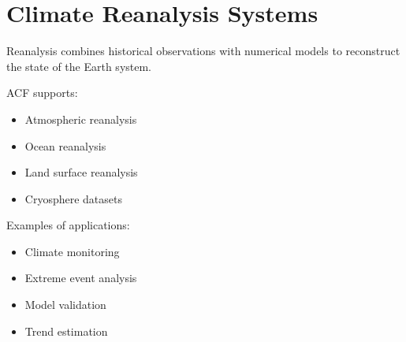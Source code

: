 \section{Climate Reanalysis Systems}


Reanalysis combines historical observations with numerical
models to reconstruct the state of the Earth system.



ACF supports:


\begin{itemize}

\item Atmospheric reanalysis

\item Ocean reanalysis

\item Land surface reanalysis

\item Cryosphere datasets

\end{itemize}



Examples of applications:


\begin{itemize}

\item Climate monitoring

\item Extreme event analysis

\item Model validation

\item Trend estimation

\end{itemize}
